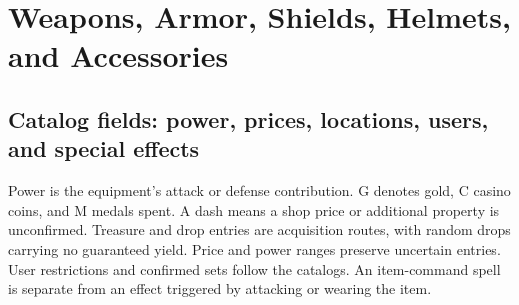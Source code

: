 \chapter{Weapons, Armor, Shields, Helmets, and Accessories}
\label{written-equipment}

\section{Catalog fields: power, prices, locations, users, and special effects}
Power is the equipment's attack or defense contribution. G denotes gold, C casino coins, and M medals spent. A dash means a shop price or additional property is unconfirmed. Treasure and drop entries are acquisition routes, with random drops carrying no guaranteed yield. Price and power ranges preserve uncertain entries. User restrictions and confirmed sets follow the catalogs. An item-command spell is separate from an effect triggered by attacking or wearing the item.

